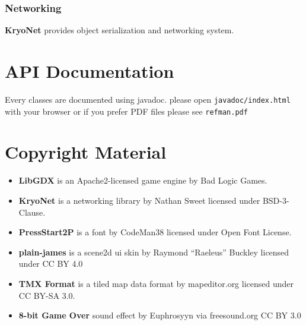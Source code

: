 \documentclass{article}
\providecommand{\tightlist}{%
	\setlength{\itemsep}{0pt}\setlength{\parskip}{0pt}}
\begin{document}
\hypertarget{networking}{%
\subsubsection{Networking}\label{networking}}

\textbf{KryoNet} provides object serialization and networking system.

\hypertarget{api-documentation}{%
\section{API Documentation}\label{api-documentation}}

Every classes are documented using javadoc. please open
\texttt{javadoc/index.html} with your browser or if you prefer PDF files
please see \texttt{refman.pdf}

\hypertarget{copyright-material}{%
\section{Copyright Material}\label{copyright-material}}

\begin{itemize}
\tightlist
\item
  \textbf{LibGDX} is an Apache2-licensed game engine by Bad Logic Games.
\item
  \textbf{KryoNet} is a networking library by Nathan Sweet licensed
  under BSD-3-Clause.
\item
  \textbf{PressStart2P} is a font by CodeMan38 licensed under Open Font
  License.
\item
  \textbf{plain-james} is a scene2d ui skin by Raymond ``Raeleus''
  Buckley licensed under CC BY 4.0
\item
  \textbf{TMX Format} is a tiled map data format by mapeditor.org
  licensed under CC BY-SA 3.0.
\item
  \textbf{8-bit Game Over} sound effect by Euphrosyyn via freesound.org
  CC BY 3.0
\end{itemize}
\end{document}

